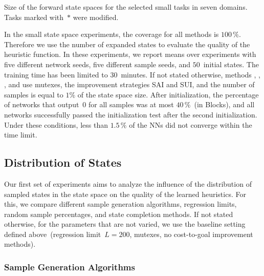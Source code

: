 \begin{table}[tb]
    \caption[Size of the forward state spaces for the selected domains.]{Size of the forward state spaces for the selected small tasks in seven domains. Tasks marked with~$*$ were modified.} 
    \label{tab:small-fss-size}
    \addmargin
    \centering
    
\end{table}

In the small state space experiments, the coverage for all methods is $100\,\%$. Therefore we use the number of expanded states to evaluate the quality of the heuristic function. In these experiments, we report means over experiments with five different network seeds, five different sample seeds, and $50$~initial states. The training time has been limited to $30$~minutes. If not stated otherwise, methods \bfs, \dfs, \rw, and \bfsrw use mutexes, the improvement strategies SAI and SUI, and the number of samples is equal to $1\%$ of the state space size. After initialization, the percentage of networks that output~$0$ for all samples was at most $40\,\%$~(in Blocks), and all networks successfully passed the initialization test after the second initialization. Under these conditions, less than $1.5\,\%$ of the NNs did not converge within the time limit.

\subsection{Distribution of States}
\label{sec:small-exps-distribution}

Our first set of experiments aims to analyze the influence of the distribution of sampled states in the state space on the quality of the learned heuristics. For this, we compare different sample generation algorithms, regression limits, random sample percentages, and state completion methods. If not stated otherwise, for the parameters that are not varied, we use the baseline setting defined above~(regression limit~$L=200$, mutexes, no cost-to-goal improvement methods).

\subsubsection{Sample Generation Algorithms}
\label{sec:small-exps-algorithm}

